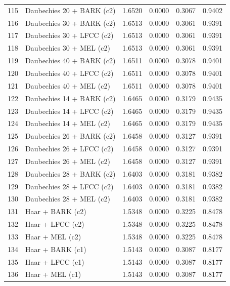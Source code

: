 \begin{longtable}{@{}rlrrrr@{}}
115 & Daubechies 20 + BARK (c2) & 1.6520 & 0.0000 & 0.3067 & 0.9402 \\
116 & Daubechies 30 + BARK (c2) & 1.6513 & 0.0000 & 0.3061 & 0.9391 \\
117 & Daubechies 30 + LFCC (c2) & 1.6513 & 0.0000 & 0.3061 & 0.9391 \\
118 & Daubechies 30 + MEL (c2) & 1.6513 & 0.0000 & 0.3061 & 0.9391 \\
119 & Daubechies 40 + BARK (c2) & 1.6511 & 0.0000 & 0.3078 & 0.9401 \\
120 & Daubechies 40 + LFCC (c2) & 1.6511 & 0.0000 & 0.3078 & 0.9401 \\
121 & Daubechies 40 + MEL (c2) & 1.6511 & 0.0000 & 0.3078 & 0.9401 \\
122 & Daubechies 14 + BARK (c2) & 1.6465 & 0.0000 & 0.3179 & 0.9435 \\
123 & Daubechies 14 + LFCC (c2) & 1.6465 & 0.0000 & 0.3179 & 0.9435 \\
124 & Daubechies 14 + MEL (c2) & 1.6465 & 0.0000 & 0.3179 & 0.9435 \\
125 & Daubechies 26 + BARK (c2) & 1.6458 & 0.0000 & 0.3127 & 0.9391 \\
126 & Daubechies 26 + LFCC (c2) & 1.6458 & 0.0000 & 0.3127 & 0.9391 \\
127 & Daubechies 26 + MEL (c2) & 1.6458 & 0.0000 & 0.3127 & 0.9391 \\
128 & Daubechies 28 + BARK (c2) & 1.6403 & 0.0000 & 0.3181 & 0.9382 \\
129 & Daubechies 28 + LFCC (c2) & 1.6403 & 0.0000 & 0.3181 & 0.9382 \\
130 & Daubechies 28 + MEL (c2) & 1.6403 & 0.0000 & 0.3181 & 0.9382 \\
131 & Haar + BARK (c2) & 1.5348 & 0.0000 & 0.3225 & 0.8478 \\
132 & Haar + LFCC (c2) & 1.5348 & 0.0000 & 0.3225 & 0.8478 \\
133 & Haar + MEL (c2) & 1.5348 & 0.0000 & 0.3225 & 0.8478 \\
134 & Haar + BARK (c1) & 1.5143 & 0.0000 & 0.3087 & 0.8177 \\
135 & Haar + LFCC (c1) & 1.5143 & 0.0000 & 0.3087 & 0.8177 \\
136 & Haar + MEL (c1) & 1.5143 & 0.0000 & 0.3087 & 0.8177 \\
\end{longtable}
